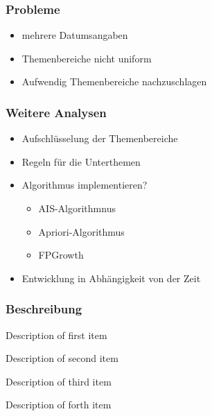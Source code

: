\documentclass[12pt, xcolor=table]{beamer}
\begin{document}
\begin{frame}
	\frametitle{Probleme}
	\begin{itemize}
		\item mehrere Datumsangaben
		\item Themenbereiche nicht uniform
		\item Aufwendig Themenbereiche nachzuschlagen
	\end{itemize}
\end{frame}
\begin{frame}
	\frametitle{Weitere Analysen}
	\begin{itemize}
		\item Aufschlüsselung der Themenbereiche
		\item Regeln für die Unterthemen
		\item Algorithmus implementieren?
			\begin{itemize}
				\item AIS-Algorithmnus
				\item Apriori-Algorithmus 
				\item FPGrowth 
			\end{itemize}
		\item Entwicklung in Abhängigkeit von der Zeit
	\end{itemize}
\end{frame}
\begin{frame}
	\frametitle{Beschreibung}
\begin{description}
	\item[First Item] Description of first item
	\item[Second Item] Description of second item
	\item[Third Item] Description of third item
	\item[Forth Item] Description of forth item
\end{description}
\end{frame}
\end{document}
